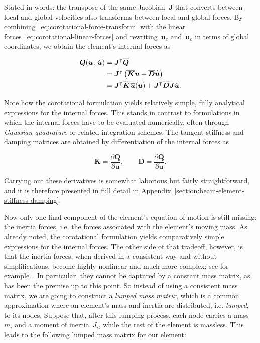 Stated in words: the transpose of the same Jacobian~$\boldsymbol{J}$ that converts between local and global velocities also transforms between local and global forces.
By combining~\eqref{eq:corotational-force-transform} with the linear forces~\eqref{eq:corotational-linear-forces} and rewriting~$\boldsymbol{u}_{e}$ and~$\dot{\boldsymbol{u}}_{e}$ in terms of global coordinates, we obtain
the element's internal forces as

\begin{align}
\boldsymbol{Q}(\boldsymbol{u},\,\dot{\boldsymbol{u}}) &= \boldsymbol{J}^\intercal\overline{\boldsymbol{Q}} \notag \\
&= \boldsymbol{J}^\intercal\left(\overline{\boldsymbol{K}}\overline{\boldsymbol{u}} + \overline{\boldsymbol{D}}\dot{\overline{\boldsymbol{u}}}\right) \notag \\
&= \boldsymbol{J}^\intercal\overline{\boldsymbol{K}}\overline{\boldsymbol{u}}(\boldsymbol{u}) + \boldsymbol{J}^\intercal\overline{\boldsymbol{D}}\boldsymbol{J}\dot{\boldsymbol{u}}.
\end{align}

Note how the corotational formulation yields relatively simple, fully analytical expressions for the internal forces.
This stands in contrast to formulations in which the internal forces have to be evaluated numerically, often through \textit{Gaussian quadrature} or related integration schemes.
The tangent stiffness and damping matrices are obtained by differentiation of the internal forces as

\begin{equation}
\boldsymbol{K} = \frac{\partial\boldsymbol{Q}}{\partial\boldsymbol{u}}, \qquad \boldsymbol{D} = \frac{\partial\boldsymbol{Q}}{\partial\dot{\boldsymbol{u}}}.
\end{equation}

Carrying out these derivatives is somewhat laborious but fairly straightforward, and it is therefore presented in full detail in Appendix~\ref{section:beam-element-stiffness-damping}.

Now only one final component of the element's equation of motion is still missing: the inertia forces, i.e. the forces associated with the element's moving mass.
As already noted, the corotational formulation yields comparatively simple expressions for the internal forces.
The other side of that tradeoff, however, is that the inertia forces, when derived in a consistent way and without simplifications, become highly nonlinear and much more complex; see for example~\cite{bib:le2011}.
In particular, they cannot be captured by a constant mass matrix, as has been the premise up to this point.
So instead of using a consistent mass matrix, we are going to construct a \textit{lumped mass matrix}, which is a common approximation where an element's mass and inertia are distributed, i.e. \textit{lumped}, to its nodes.
Suppose that, after this lumping process, each node carries a mass~$m_i$ and a moment of inertia~$J_i$, while the rest of the element is massless.
This leads to the following lumped mass matrix for our element:

